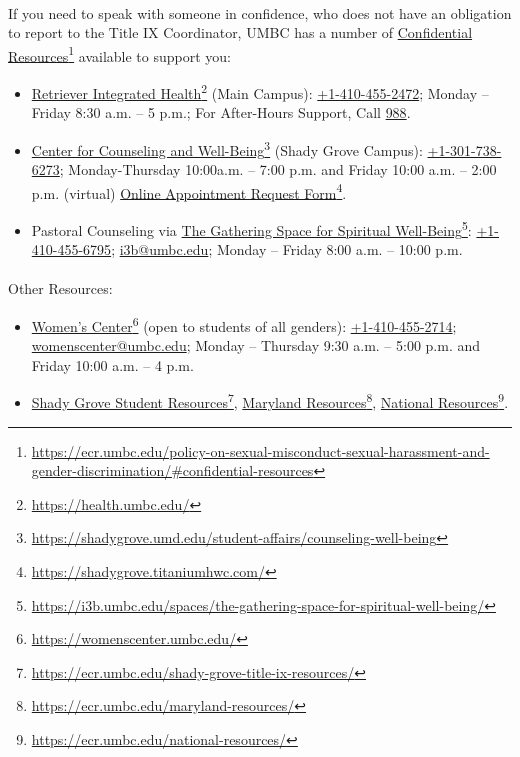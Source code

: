 \documentclass[letter,10pt]{article}
\begin{document}
\paragraph{}If you need to speak with someone in confidence, who does not have an obligation to report to the Title IX Coordinator, UMBC has a number of \href{https://ecr.umbc.edu/policy-on-sexual-misconduct-sexual-harassment-and-gender-discrimination/#confidential-resources}{Confidential Resources}\footnote{\url{https://ecr.umbc.edu/policy-on-sexual-misconduct-sexual-harassment-and-gender-discrimination/\#confidential-resources}} available to support you: 

\begin{itemize}
\item \href{https://health.umbc.edu/}{Retriever Integrated Health}\footnote{\url{https://health.umbc.edu/}} (Main Campus): \href{tel:+1-410-455-2472}{+1-410-455-2472}; Monday – Friday 8:30 a.m. – 5 p.m.; For After-Hours Support, Call \href{tel:988}{988}.

\item \href{https://shadygrove.umd.edu/student-affairs/counseling-well-being}{Center for Counseling and Well-Being}\footnote{\url{https://shadygrove.umd.edu/student-affairs/counseling-well-being}} (Shady Grove Campus): \href{tel:+13017386273}{+1-301-738-6273}; Monday-Thursday 10:00a.m. – 7:00 p.m. and Friday 10:00 a.m. – 2:00 p.m. (virtual) \href{https://shadygrove.titaniumhwc.com/}{Online Appointment Request Form}\footnote{\url{https://shadygrove.titaniumhwc.com/}}.

\item Pastoral Counseling via \href{https://i3b.umbc.edu/spaces/the-gathering-space-for-spiritual-well-being/}{The Gathering Space for Spiritual Well-Being}\footnote{\url{https://i3b.umbc.edu/spaces/the-gathering-space-for-spiritual-well-being/}}: \href{tel:+14104556795}{+1-410-455-6795}; \href{mailto:i3b@umbc.edu}{i3b@umbc.edu}; Monday – Friday 8:00 a.m. – 10:00 p.m.
\end{itemize}

\paragraph{}Other Resources:
\begin{itemize}
\item\href{https://womenscenter.umbc.edu/}{Women’s Center}\footnote{\url{https://womenscenter.umbc.edu/}} (open to students of all genders): \href{tel:+14104552714}{+1-410-455-2714}; \href{mailto:womenscenter@umbc.edu}{womenscenter@umbc.edu}; Monday – Thursday 9:30 a.m. – 5:00 p.m. and Friday 10:00 a.m. – 4 p.m.

\item\href{https://ecr.umbc.edu/shady-grove-title-ix-resources/}{Shady Grove Student Resources}\footnote{\url{https://ecr.umbc.edu/shady-grove-title-ix-resources/}}, \href{https://ecr.umbc.edu/maryland-resources/}{Maryland Resources}\footnote{\url{https://ecr.umbc.edu/maryland-resources/}}, \href{https://ecr.umbc.edu/national-resources/}{National Resources}\footnote{\url{https://ecr.umbc.edu/national-resources/}}.
\end{itemize}
\end{document}
